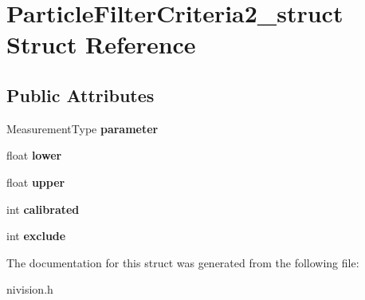 \hypertarget{structParticleFilterCriteria2__struct}{\section{\-Particle\-Filter\-Criteria2\-\_\-struct \-Struct \-Reference}
\label{structParticleFilterCriteria2__struct}
}
\subsection*{\-Public \-Attributes}
\begin{DoxyCompactItemize}
\item 
\hypertarget{structParticleFilterCriteria2__struct_a92f1ffea23930a8b58c64f48f4dd62d4}{\-Measurement\-Type {\bfseries parameter}}\label{structParticleFilterCriteria2__struct_a92f1ffea23930a8b58c64f48f4dd62d4}

\item 
\hypertarget{structParticleFilterCriteria2__struct_a55eb00e3c3928286c84cd1cbc439aa3f}{float {\bfseries lower}}\label{structParticleFilterCriteria2__struct_a55eb00e3c3928286c84cd1cbc439aa3f}

\item 
\hypertarget{structParticleFilterCriteria2__struct_ab15ec805f01adb1a0a02404d6ea9dfa1}{float {\bfseries upper}}\label{structParticleFilterCriteria2__struct_ab15ec805f01adb1a0a02404d6ea9dfa1}

\item 
\hypertarget{structParticleFilterCriteria2__struct_af5f73417974f564a17cca32f5f6ec6e0}{int {\bfseries calibrated}}\label{structParticleFilterCriteria2__struct_af5f73417974f564a17cca32f5f6ec6e0}

\item 
\hypertarget{structParticleFilterCriteria2__struct_a959bf3aa7d6787a582a4b5c835ceefcf}{int {\bfseries exclude}}\label{structParticleFilterCriteria2__struct_a959bf3aa7d6787a582a4b5c835ceefcf}

\end{DoxyCompactItemize}


\-The documentation for this struct was generated from the following file\-:\begin{DoxyCompactItemize}
\item 
nivision.\-h\end{DoxyCompactItemize}

